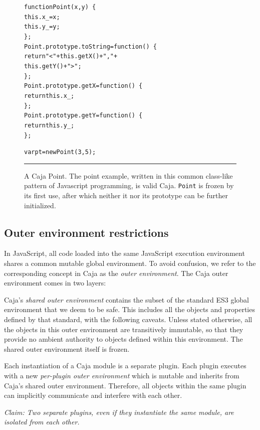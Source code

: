 \documentclass[letterpaper,twocolumn,10pt]{article}
\newcommand{\code}[1]{{\tt {#1}}}              %
\begin{document}
  
\begin{figure}[t!]
\begin{alltt}
function Point(x, y)\ \{
  this.x\_ = x;
  this.y\_ = y;
\};
Point.prototype.toString = function()\ \{ 
  return "<" + this.getX() + "," + 
               this.getY() + ">"; 
\};
Point.prototype.getX = function()\ \{ 
  return this.x\_; 
\};
Point.prototype.getY = function()\ \{ 
  return this.y\_; 
\};

var pt = new Point(3, 5);
\end{alltt}

\caption[A Caja Point.]{A Caja Point. The point example, written
in this common class-like pattern of Javascript programming, is valid Caja.
\code{Point} is frozen by its first use, after which neither it nor its
prototype can be further initialized. \\ } \hrule
\label{fig:caja-point}
\end{figure}


\subsection{Outer environment restrictions}

In JavaScript, all code loaded into the same JavaScript execution environment 
shares a common mutable global environment. To avoid confusion, we refer to 
the corresponding concept in Caja as the \emph{outer environment}. The Caja 
outer environment comes in two layers:

Caja's \emph{shared outer environment} contains the subset of the standard 
ES3 global environment that we deem to be safe. This includes all the objects 
and properties defined by that standard, with the following caveats. Unless 
stated otherwise, all the objects in this outer environment are transitively 
immutable, so that they provide no ambient authority to objects defined 
within this environment. The shared outer environment itself is frozen.

Each instantiation of a Caja module is a separate plugin. Each plugin 
executes with a new \emph{per-plugin outer environment} which is mutable and 
inherits from Caja's shared outer environment. Therefore, all objects within 
the same plugin can implicitly communicate and interfere with each other. 

\emph{Claim: Two separate plugins, even if they instantiate the same module, 
are isolated from each other.}
\end{document}
